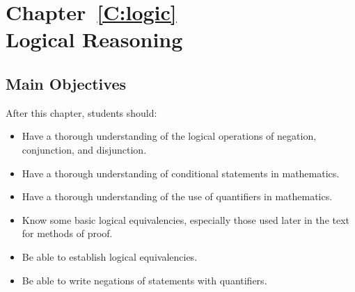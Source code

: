 














\chapter*{Chapter~\ref{C:logic} \\Logical Reasoning}

\section*{Main Objectives}
After this chapter, students should:
\begin{itemize}
\item Have a thorough understanding of the logical operations of negation, conjunction, and disjunction.
\item Have a thorough understanding of conditional statements in mathematics.
\item Have a thorough understanding of the use of quantifiers in mathematics.
\item Know some basic logical equivalencies, especially those used later in the text for methods of proof.
\item Be able to establish logical equivalencies.
\item Be able to write negations of statements with quantifiers.
\end{itemize}
\hbreak




%
%
%


